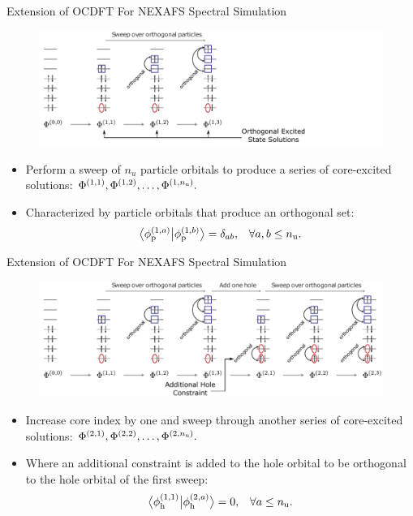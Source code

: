 \documentclass[t]{beamer}
\newcommand{\braket}[3][0]
{\ifthenelse{\equal{#1}{0}}{\left\langle #2 \middle| #3 \right\rangle}
{\ifthenelse{\equal{#1}{1}}{\big\langle #2 \big| #3 \big\rangle}
{\ifthenelse{\equal{#1}{2}}{\Big\langle #2 \Big| #3 \Big\rangle}
{\ifthenelse{\equal{#1}{3}}{\bigg\langle #2 \bigg| #3 \bigg\rangle}
{\ifthenelse{\equal{#1}{4}}{\Bigg\langle #2 \Bigg| #3 \Bigg\rangle}
{Error}}}}}
}
\begin{document}
\begin{frame}{Extension of OCDFT For NEXAFS Spectral Simulation}
\begin{figure}[!t]
\includegraphics[scale=0.65]{CMHP_alg2.pdf}
\end{figure}
\begin{itemize}
\item Perform a sweep of $n_u$ particle orbitals to produce a series of core-excited solutions: $\Phi^{(1,1)}, \Phi^{(1,2)}, \ldots, \Phi^{(1,n_{\rm u})}.$
\item Characterized by particle orbitals that produce an orthogonal set:
\begin{align}
\braket[1]{\phi^{(1,a)}_{\rm p}}{\phi^{(1,b)}_{\rm p}} &= \delta_{ab}, &\forall a,b \leq n_{\rm u}.
\end{align}
\end{itemize}
\end{frame}
\begin{frame}{Extension of OCDFT For NEXAFS Spectral Simulation}
\begin{figure}[!t]
\includegraphics[scale=0.65]{CMHP_alg3.pdf}
\end{figure}
\begin{itemize}
\item Increase core index by one and sweep through another series of core-excited solutions: $\Phi^{(2,1)}, \Phi^{(2,2)}, \ldots, \Phi^{(2,n_{\rm u})}.$
\item Where an additional constraint is added to the hole orbital to be orthogonal to the hole orbital of the first sweep:
\begin{align}
\braket[1]{\phi^{(1,1)}_{\rm h}}{\phi^{(2,a)}_{\rm h}} &=0,&\forall a \leq n_{\rm u}.
\end{align}
\end{itemize}
\end{frame}
\end{document}
